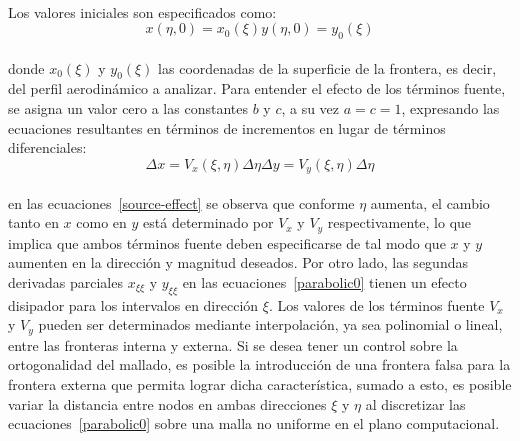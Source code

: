 \documentclass[letterpaper, openright, 12pt]{book}
\begin{document}
    \paragraph*{}
        Los valores iniciales son especificados como:
        \begin{subequations}
            \begin{equation}
                x(\eta, 0) = x_0(\xi)
            \end{equation}
            \begin{equation}
                y(\eta, 0) = y_0(\xi)
            \end{equation}
        \end{subequations}\\
        donde $x_0(\xi)$ y $y_0(\xi)$ las coordenadas de la superficie de la
        frontera, es decir, del perfil aerodinámico a analizar. Para entender el
        efecto de los términos fuente, se asigna un valor cero a las constantes
        $b$ y $c$, a su vez $a = c = 1$, expresando las ecuaciones resultantes
        en términos de incrementos en lugar de términos diferenciales:
        \begin{subequations}
            \begin{equation}
                \Delta x = V_x(\xi, \eta) \Delta \eta
            \end{equation}
            \begin{equation}
                \Delta y = V_y(\xi, \eta) \Delta \eta
            \end{equation}
            \label{source-effect}
        \end{subequations}\\
        en las ecuaciones~\ref{source-effect} se observa que conforme $\eta$
        aumenta, el cambio tanto en $x$ como en $y$ está determinado por $V_x$
        y $V_y$ respectivamente, lo que implica que ambos términos fuente deben
        especificarse de tal modo que $x$ y $y$ aumenten en la dirección y
        magnitud deseados. Por otro lado, las segundas derivadas parciales
        $x_{\xi\xi}$ y $y_{\xi\xi}$ en las ecuaciones~\ref{parabolic0} tienen un
        efecto disipador para los intervalos en dirección $\xi$. Los valores de
        los términos fuente $V_x$ y $V_y$ pueden ser determinados mediante
        interpolación, ya sea polinomial o lineal, entre las fronteras interna y
        externa. Si se desea tener un control sobre la ortogonalidad del
        mallado, es posible la introducción de una frontera falsa para la
        frontera externa que permita lograr dicha característica, sumado a esto,
        es posible variar la distancia entre nodos en ambas direcciones $\xi$ y
        $\eta$ al discretizar las ecuaciones~\ref{parabolic0} sobre una malla no
        uniforme en el plano computacional.
\end{document}
